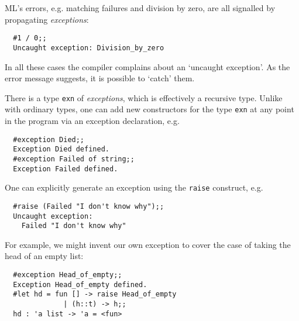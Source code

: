 \begin{slide*}


\vspace*{0.5cm}

ML's errors, e.g. matching failures and division by zero, are all signalled by
propagating {\em exceptions}:

\begin{black}\begin{verbatim}
  #1 / 0;;
  Uncaught exception: Division_by_zero
\end{verbatim}\end{black}

In all these cases the compiler complains about an `uncaught exception'. As the
error message suggests, it is possible to `catch' them.

There is a type {\black \tt exn} of {\em exceptions}, which is effectively a
recursive type. Unlike with ordinary types, one can add new constructors for
the type {\black \tt exn} at any point in the program via an exception
declaration, e.g.

\begin{black}\begin{verbatim}
  #exception Died;;
  Exception Died defined.
  #exception Failed of string;;
  Exception Failed defined.
\end{verbatim}\end{black}

\end{slide*}




\begin{slide*}


\vspace*{0.5cm}

One can explicitly generate an exception using the {\black \tt raise}
construct, e.g.

\begin{black}\begin{verbatim}
  #raise (Failed "I don't know why");;
  Uncaught exception:
    Failed "I don't know why"
\end{verbatim}\end{black}

For example, we might invent our own exception to cover the case of taking the
head of an empty list:

\begin{black}\begin{verbatim}
  #exception Head_of_empty;;
  Exception Head_of_empty defined.
  #let hd = fun [] -> raise Head_of_empty
              | (h::t) -> h;;
  hd : 'a list -> 'a = <fun>
\end{verbatim}\end{black}

\end{slide*}

